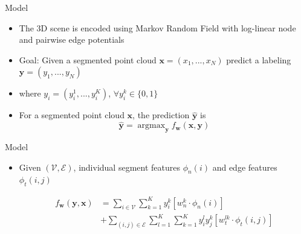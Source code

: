 \documentclass{beamer}
\DeclareMathOperator*{\argmax}{argmax}
\newcommand{\x}{{\mathbf x}}     %
\newcommand{\xs}[1]{{x_{#1}}}    %
\newcommand{\y}{{\mathbf y}}     %
\newcommand{\ys}[1]{{y_{#1}}}    %
\newcommand{\ysc}[2]{{y_{#1}^{#2}}}    %
\newcommand{\fn}[1]{{\phi_n(#1)}}      %
\newcommand{\fe}[3]{{\phi_{#1}(#2,#3)}}%
\newcommand{\w}{{\mathbf w}}           %
\newcommand{\wn}[1]{{w_n^{#1}}}        %
\newcommand{\we}[3]{{w_{#1}^{#2#3}}}   %
\newcommand{\df}[3]{{f_{#3}(#1,#2)}}   %
\begin{document}
\begin{frame}{Model}
\begin{itemize}

 \item The 3D scene is encoded using Markov Random Field with log-linear node and pairwise edge potentials
 
 
\item Goal: Given a segmented point cloud $\x=(\xs{1},...,\xs{N})$  predict a labeling $\y=(\ys{1},...,\ys{N})$

\item where $\ys{i}=(\ysc{i}{1},...,\ysc{i}{K})$,  $ \forall \ysc{i}{k} \in \{0,1\}$ 


\item For a segmented point cloud $\x$, the prediction $\hat{\y}$ is 
\begin{equation} \label{eq:argmax}
\hat{\y} = \argmax_\y \df{\x}{\y}{\w}
\end{equation}

\end{itemize}
\end{frame}


\begin{frame}{Model}
\begin{itemize}

\item Given $(\mathcal{V},\mathcal{E})$, individual segment features $\fn{i}$ and edge features $\fe{t}{i}{j}$

\begin{equation} \label{eq:model}
\begin{split}
\df{\y}{\x}{\w} & = \sum_{i \in \mathcal{V}} \sum_{k=1}^{K} \ysc{i}{k} \left[\wn{k} \cdot \fn{i} \right] \\
 & + \sum_{(i,j)\in \mathcal{E}}   \sum_{l=1}^{K}  \sum_{k=1}^{K} \ysc{i}{l} \ysc{j}{k}  \left[\we{t}{l}{k} \cdot \fe{t}{i}{j}\right] 
 \end{split}
\end{equation}

\end{itemize}
\end{frame}
\end{document}
